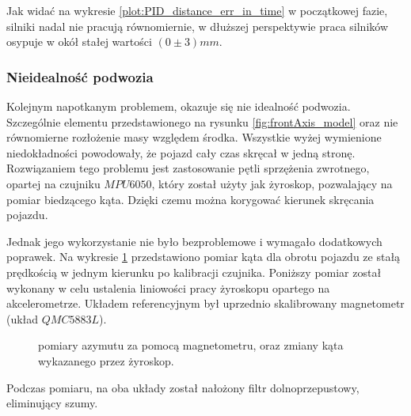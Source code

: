             Jak widać na wykresie \ref{plot:PID_distance_err_in_time} w początkowej fazie, silniki nadal nie pracują równomiernie, w dłuższej perspektywie praca silników osypuje w okół stałej wartości $(0 \pm 3)mm$.

    \subsubsection{Nieidealność podwozia}
        Kolejnym napotkanym problemem, okazuje się nie idealność podwozia.
        Szczególnie elementu przedstawionego na rysunku \ref{fig:frontAxis_model} oraz nie równomierne rozłożenie masy względem środka.
        Wszystkie wyżej wymienione niedokładności powodowały, że pojazd cały czas skręcał w jedną stronę.
        Rozwiązaniem tego problemu jest zastosowanie pętli sprzężenia zwrotnego, opartej na czujniku $MPU6050$, który został użyty jak żyroskop, pozwalający na pomiar biedzącego kąta.
        Dzięki czemu można korygować kierunek skręcania pojazdu.
        
        Jednak jego wykorzystanie nie było bezproblemowe i wymagało dodatkowych poprawek.
        Na wykresie \ref{plot:gyro_magneto_measure} przedstawiono pomiar kąta dla obrotu pojazdu ze stałą prędkością w jednym kierunku po kalibracji czujnika.
        Poniższy pomiar został wykonany w celu ustalenia liniowości pracy żyroskopu opartego na akcelerometrze. 
        Układem referencyjnym był uprzednio skalibrowany magnetometr (układ $QMC5883L$).
% 
        \begin{figure}[!ht]
            \centering
                \renewcommand{\figurename}{Wykres}
                \caption{pomiary azymutu za pomocą magnetometru, oraz zmiany kąta wykazanego przez żyroskop.}
                \label{plot:gyro_magneto_measure}
        \end{figure}
        Podczas pomiaru, na oba układy został nałożony filtr dolnoprzepustowy, eliminujący szumy.

